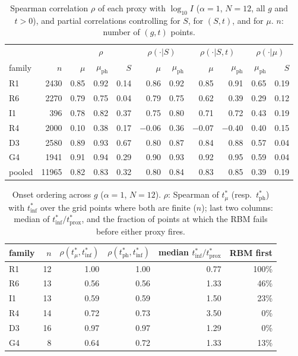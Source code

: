 \documentclass[11pt,a4paper]{article}
\newcommand{\inff}{I}
\newcommand{\tmu}{t^*_\mu}
\newcommand{\tinf}{t^*_{\mathrm{inf}}}
\newcommand{\tph}{t^*_{\mathrm{ph}}}
\newcommand{\tprox}{t^*_{\mathrm{prox}}}
\begin{document}
\begin{table}[h]
  \centering
  \caption{Spearman correlation $\rho$ of each proxy with $\log_{10}\inff$ ($\alpha=1$, $N=12$, all $g$ and
    $t>0$), and partial correlations controlling for $S$, for $(S,t)$, and for $\mu$. $n$: number of $(g,t)$ points.}
  \label{tab:rydcorr}
  \footnotesize
  \setlength{\tabcolsep}{4pt}
  \begin{tabular}{lr@{\hspace{1.2em}}rrr@{\hspace{1.2em}}rr@{\hspace{1.2em}}rr@{\hspace{1.2em}}rr}
    \toprule
    & & \multicolumn{3}{c}{$\rho$} & \multicolumn{2}{c}{$\rho(\cdot|S)$} & \multicolumn{2}{c}{$\rho(\cdot|S,t)$}
      & \multicolumn{2}{c}{$\rho(\cdot|\mu)$}\\
    family & $n$ & $\mu$ & $\mu_{\mathrm{ph}}$ & $S$ & $\mu$ & $\mu_{\mathrm{ph}}$ & $\mu$ & $\mu_{\mathrm{ph}}$
      & $\mu_{\mathrm{ph}}$ & $S$\\
    \midrule
    R1 & 2430 & 0.85 & 0.92 & 0.14 & 0.86 & 0.92 & 0.85 & 0.91 & 0.65 & 0.19\\
    R6 & 2270 & 0.79 & 0.75 & 0.04 & 0.79 & 0.75 & 0.62 & 0.39 & 0.29 & 0.12\\
    I1 & 396  & 0.78 & 0.82 & 0.37 & 0.75 & 0.80 & 0.71 & 0.72 & 0.43 & 0.19\\
    R4 & 2000 & 0.10 & 0.38 & 0.17 & $-0.06$ & 0.36 & $-0.07$ & $-0.40$ & 0.40 & 0.15\\
    D3 & 2580 & 0.89 & 0.93 & 0.67 & 0.80 & 0.87 & 0.84 & 0.88 & 0.57 & 0.04\\
    G4 & 1941 & 0.91 & 0.94 & 0.29 & 0.90 & 0.93 & 0.92 & 0.95 & 0.59 & 0.04\\
    \midrule
    pooled & 11965 & 0.82 & 0.83 & 0.32 & 0.80 & 0.84 & 0.83 & 0.85 & 0.39 & 0.19\\
    \bottomrule
  \end{tabular}
\end{table}

\begin{table}[h]
  \centering
  \caption{Onset ordering across $g$ ($\alpha=1$, $N=12$). $\rho$: Spearman of $\tmu$ (resp.\ $\tph$) with $\tinf$
    over the grid points where both are finite ($n$); last two columns: median of $\tinf/\tprox$, and the
    fraction of points at which the RBM fails before either proxy fires.}
  \label{tab:rydorder}
  \small
  \begin{tabular}{lrrrrr}
    \toprule
    family & $n$ & $\rho(\tmu,\tinf)$ & $\rho(\tph,\tinf)$ & median $\tinf/\tprox$ & RBM first\\
    \midrule
    R1 & 12 & 1.00 & 1.00 & 0.77 & 100\%\\
    R6 & 13 & 0.56 & 0.56 & 1.33 & 46\%\\
    I1 & 13 & 0.59 & 0.59 & 1.50 & 23\%\\
    R4 & 14 & 0.72 & 0.73 & 3.50 & 0\%\\
    D3 & 16 & 0.97 & 0.97 & 1.29 & 0\%\\
    G4 & 8 & 0.64 & 0.72 & 1.33 & 13\%\\
    \bottomrule
  \end{tabular}
\end{table}
\end{document}
